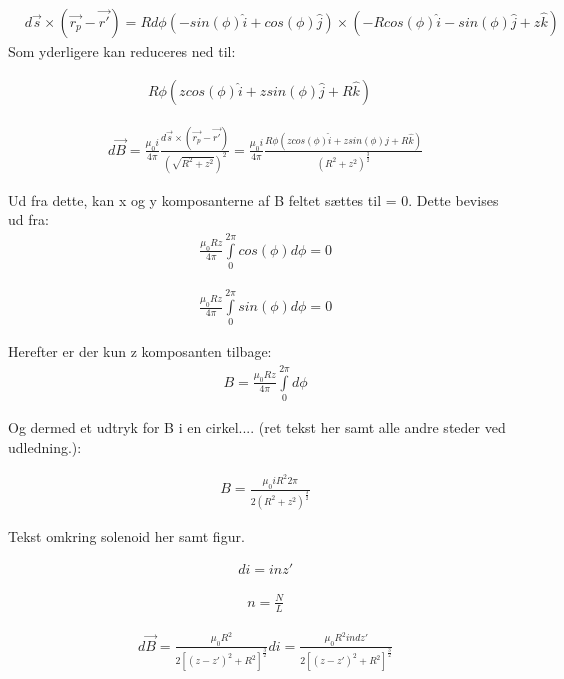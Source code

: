 	
\begin{align}
	&d\vec{s}\times(\vec{r_p}-\vec{r'})=R d\phi (-sin(\phi)\hat{i}+cos(\phi)\hat{j})\times (-R cos(\phi)\hat{i}-sin(\phi)\hat{j}+z\hat{k})
\end{align}	
Som yderligere kan reduceres ned til:

\begin{align}
	R \phi (z cos(\phi)\hat{i}+z sin(\phi)\hat{j}+R\hat{k})
\end{align}

\begin{align}
	&d\vec{B}=\frac{\mu_0 i}{4\pi} \frac{d\vec{s}\times (\vec{r_p}-\vec{r'})}{(\sqrt{R^2+z^2})^2}=\frac{\mu_0 i}{4\pi} \frac{R \phi (z cos(\phi)\hat{i}+z sin(\phi)\hat{j}+R\hat{k})}{(R^2+z^2)^\frac{3}{2}}
\end{align}


Ud fra dette, kan x og y komposanterne af B feltet sættes til = 0. Dette bevises ud fra:
\begin{align}
	&\frac{\mu_0 R z}{4\pi} \int\limits_{0}^{2\pi}cos(\phi)d\phi = 0
\end{align}


\begin{align}
	&\frac{\mu_0 R z}{4\pi} \int\limits_{0}^{2\pi}sin(\phi)d\phi = 0
\end{align}

Herefter er der kun z komposanten tilbage:
\begin{align}
	&B=\frac{\mu_0 R z}{4\pi} \int\limits_{0}^{2\pi}d\phi
\end{align}

Og dermed et udtryk for B i en cirkel.... (ret tekst her samt alle andre steder ved udledning.):


\begin{align}
	&B=\frac{\mu_0 iR^2 2\pi}{2(R^2+z^2)^\frac{3}{2}}
\end{align}




Tekst omkring solenoid her samt figur.



\begin{align}
	&di=inz'
\end{align}

\begin{align}
	&n=\frac{N}{L}
\end{align}

\begin{align}
	&d\vec{B}=\frac{\mu_0 R^2}{2[(z-z')^2+R^2]^\frac{3}{2}}di = \frac{\mu_0 R^2 i n dz'}{2[(z-z')^2+R^2]^\frac{3}{2}}
\end{align}


